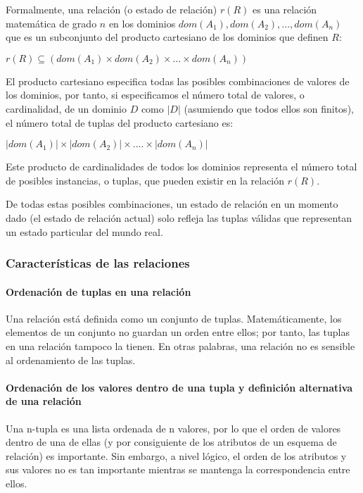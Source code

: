 Formalmente, una relación (o estado de relación) $r(R)$ es una relación matemática de grado $n$ en los dominios $dom(A_1), dom(A_2),..., dom(A_n)$ que es un subconjunto del producto cartesiano de los dominios que definen $R$:


$r(R) \subseteq (dom(A_1) \times dom(A_2) \times ... \times dom(A_n))$


El producto cartesiano especifica todas las posibles combinaciones de valores de los dominios, por tanto, si especificamos el número total de valores, o cardinalidad, de un dominio $D$ como $|D|$ (asumiendo que todos ellos son finitos), el número total de tuplas del producto cartesiano es:


$|dom(A_1)| \times |dom(A_2)| \times .... \times |dom(A_n)|$


Este producto de cardinalidades de todos los dominios representa el número total de posibles instancias, o
tuplas, que pueden existir en la relación $r(R)$.


De todas estas posibles combinaciones, un estado de relación en un momento dado (el estado de relación actual) solo refleja las tuplas válidas que representan un estado particular del mundo real. 


\subsubsection{Características de las relaciones}

\paragraph{Ordenación de tuplas en una relación}


Una relación está definida como un conjunto de tuplas. Matemáticamente, los elementos de un conjunto no guardan un orden entre ellos; por tanto, las tuplas en una relación tampoco la tienen. En otras palabras, una relación no es sensible al ordenamiento de las tuplas.


\paragraph{Ordenación de los valores dentro de una tupla y definición alternativa de una relación}

Una n-tupla es una lista ordenada de n valores, por lo que el orden de valores dentro de una de ellas (y por consiguiente de los atributos de un esquema de relación) es importante. Sin embargo, a nivel lógico, el orden de los atributos y sus valores no es tan importante mientras se mantenga la correspondencia entre ellos.

